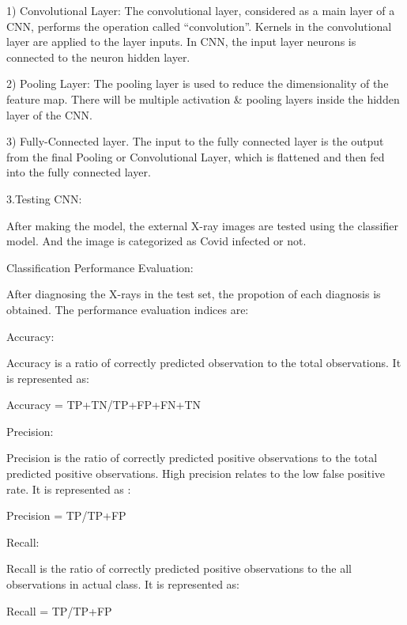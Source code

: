 1) Convolutional Layer: The convolutional layer, considered as a main layer of a CNN, performs the operation called “convolution”. Kernels in the convolutional layer are applied to the layer inputs. In CNN, the input layer neurons is connected to the neuron hidden layer.  

2) Pooling Layer: The pooling layer is used to reduce the dimensionality of the feature map. There will be multiple activation & pooling layers inside the hidden layer of the CNN. 

3) Fully-Connected layer. The input to the fully connected layer is the output from the final Pooling or Convolutional Layer, which is flattened and then fed into the fully connected layer. 

 

 

 

 

 

3.Testing CNN: 

After making the model, the external X-ray images are tested using the classifier model. And the image is categorized as Covid infected or not. 

 

Classification Performance Evaluation: 

After diagnosing the X-rays in the test set, the propotion of each diagnosis is obtained. The performance evaluation indices are: 

Accuracy: 

Accuracy is a ratio of correctly predicted observation to the total observations. It is represented as: 

Accuracy = TP+TN/TP+FP+FN+TN 

Precision: 

Precision is the ratio of correctly predicted positive observations to the total predicted positive observations. High precision relates to the low false positive rate. It is represented as : 

Precision = TP/TP+FP 

Recall: 

Recall is the ratio of correctly predicted positive observations to the all observations in actual class. It is represented as: 

Recall = TP/TP+FP 

 
